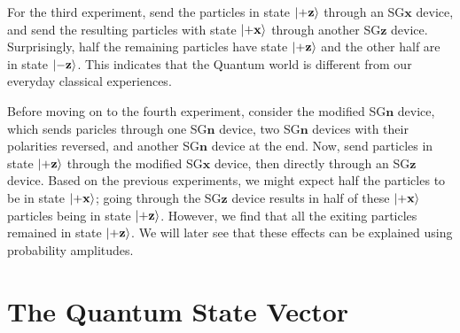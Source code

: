 \documentclass{report}
\begin{document}
For the third experiment, send the particles in state \(\ket{+ \mathbf z}\) through an SG\(\mathbf x\) device, and send the resulting particles with state \(\ket{+ \mathbf x }\) through another SG\(\mathbf z\) device. Surprisingly, half the remaining particles have state \(\ket{+ \mathbf z}\) and the other half are in state \(\ket{- \mathbf z}\). This indicates that the Quantum world is different from our everyday classical experiences. 

Before moving on to the fourth experiment, consider the modified SG\(\mathbf n\) device, which sends paricles through one SG\(\mathbf n\) device, two SG\(\mathbf n\) devices with their polarities reversed, and another SG\(\mathbf n\) device at the end. Now, send particles in state \(\ket{+ \mathbf z}\) through the modified SG\(\mathbf x\) device, then directly through an SG\(\mathbf z\) device. Based on the previous experiments, we might expect half the particles to be in state \(\ket{+ \mathbf x}\); going through the SG\(\mathbf z\) device results in half of these \(\ket{+ \mathbf x}\) particles being in state \(\ket{+ \mathbf z}\). However, we find that all the exiting particles remained in state \(\ket{+ \mathbf z}\). We will later see that these effects can be explained using probability amplitudes. 

\section{The Quantum State Vector}
\end{document}
